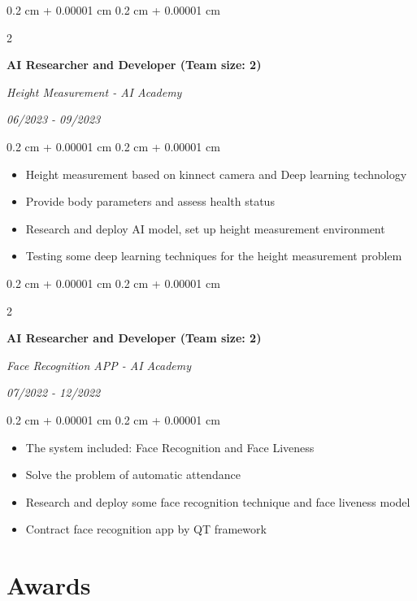 \documentclass[10pt, letterpaper]{article}
\newenvironment{highlights}{
    \begin{itemize}[
        topsep=0.10 cm,
        parsep=0.10 cm,
        partopsep=0pt,
        itemsep=0pt,
        leftmargin=0.4 cm + 10pt
    ]
}{
    \end{itemize}
} %
\newenvironment{onecolentry}{
    \begin{adjustwidth}{
        0.2 cm + 0.00001 cm
    }{
        0.2 cm + 0.00001 cm
    }
}{
    \end{adjustwidth}
} %
\newenvironment{twocolentry}[2][]{
    \onecolentry
    \def\secondColumn{#2}
    \setcolumnwidth{\fill, 4.5 cm}
    \begin{paracol}{2}
}{
    \switchcolumn \raggedleft \secondColumn
    \end{paracol}
    \endonecolentry
} %
\begin{document}
    \vspace{0.2 cm}

    \begin{twocolentry}{
        \textit{06/2023 - 09/2023}
    }
        \textbf{AI Researcher and Developer (Team size: 2)}
        
        \textit{Height Measurement - AI Academy}
    \end{twocolentry}

    \begin{onecolentry}
        \begin{highlights}
            \item Height measurement based on kinnect camera and Deep learning technology
            \item Provide body parameters and assess health status
            \item Research and deploy AI model, set up height measurement environment
            \item Testing some deep learning techniques for the height measurement problem
        \end{highlights}
    \end{onecolentry}

    \vspace{0.2 cm}

    \begin{twocolentry}{
        \textit{07/2022 - 12/2022}
    }
        \textbf{AI Researcher and Developer (Team size: 2)}
        
        \textit{Face Recognition APP - AI Academy}
    \end{twocolentry}

    \begin{onecolentry}
        \begin{highlights}
            \item The system included: Face Recognition and Face Liveness
            \item Solve the problem of automatic attendance
            \item Research and deploy some face recognition technique and face liveness model
            \item Contract face recognition app by QT framework
        \end{highlights}
    \end{onecolentry}

    \section{Awards}
\end{document}
